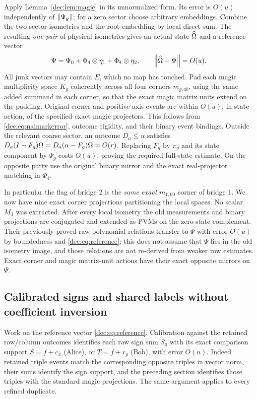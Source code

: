 Apply Lemma~\ref{dec:lem:magic} in its unnormalized form. Its error is $O(u)$ independently of $\left\lVert\Psi_g\right\rVert$; for a zero sector choose arbitrary embeddings. Combine the two sector isometries and the root embedding by local direct sum. The resulting \emph{one pair} of physical isometries gives an actual state $\widehat{\Omega}$ and a reference vector
\begin{equation}\label{dec:eq:reference}
\Psi=\Psi_0+\Phi_4\otimes\eta_1+\Phi_4\otimes\eta_2,
\qquad\left\lVert\widehat{\Omega}-\Psi\right\rVert=O(u).
\end{equation}
All junk vectors may contain $E$, which no map has touched. Pad each magic multiplicity space $K_g$ coherently across all four corners $m_{g,ab}$, using the same added summand in each corner, so that the exact magic matrix units extend on the padding. Original corner and positive-axis events are within $O(u)$, in state action, of the specified exact magic projectors. This follows from \eqref{dec:eq:naimarkerror}, outcome rigidity, and their binary event bindings. Outside the relevant coarse sector, an outcome $D_a\le\alpha$ satisfies
$D_a(I-F_g)\Omega=D_a(\alpha-F_g)\Omega=O(r)$. Replacing $F_g$ by $\pi_g$ and its state component by $\Psi_g$ costs $O(u)$, proving the required full-state estimate. On the opposite party use the original binary mirror and the exact real-projector matching in $\Phi_4$.

In particular the flag of bridge 2 is the \emph{same exact} $m_{1,00}$ corner of bridge 1. We now have nine exact corner projections partitioning the local spaces. No scalar $M_3$ was extracted. After every local isometry the old measurements and binary projections are conjugated and extended as PVMs on the zero-state complement. Their previously proved raw polynomial relations transfer to $\Psi$ with error $O(u)$ by boundedness and \eqref{dec:eq:reference}; this does not assume that $\Psi$ lies in the old isometry image, and those relations are not re-derived from weaker row estimates. Exact corner and magic matrix-unit actions have their exact opposite mirrors on $\Psi$.

\subsection{Calibrated signs and shared labels without coefficient inversion}\label{dec:sec:fms}
Work on the reference vector \eqref{dec:eq:reference}. Calibration against the retained row/column outcomes identifies each raw sign sum $S_0$ with its exact comparison support $S=f+c_x$ (Alice), or $T=f+r_y$ (Bob), with error $O(u)$. Indeed retained triple events match the corresponding opposite triples in vector norm, their sums identify the sign support, and the preceding section identifies those triples with the standard magic projections. The same argument applies to every refined duplicate.

